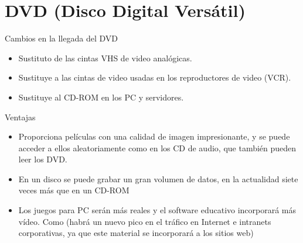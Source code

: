 \documentclass[presentation]{beamer}
\begin{document}
\section{DVD (Disco Digital  Versátil)}
\label{sec:orgbdc81f3}

\begin{frame}[label={sec:orgf122420}]{Cambios en la llegada del DVD}
\begin{itemize}
\item Sustituto de las cintas VHS de video analógicas.
\item Sustituye a las cintas de video usadas en los reproductores de video (VCR).
\item Sustituye al CD-ROM en los PC y servidores.
\end{itemize}
\end{frame}

\begin{frame}[label={sec:orgb625278}]{Ventajas}
\begin{itemize}
\item Proporciona películas con una calidad de imagen impresionante, y se puede
acceder a ellos aleatoriamente como en los CD de audio, que también pueden leer los DVD.
\item En un disco se puede grabar un gran volumen de datos, en la actualidad siete veces más que en un CD-ROM
\item Los juegos para PC serán más reales y el software educativo incorporará más vídeo.
Como (habrá un nuevo pico en el tráfico en Internet e intranets corporativas, ya que este material se incorporará a los sitios web)
\end{itemize}
\end{frame}
\end{document}
